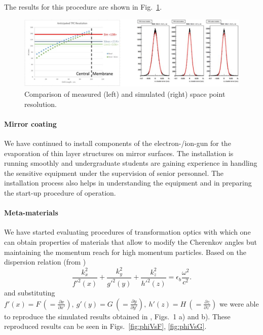 The results for this procedure are shown in Fig.~\ref{fig:TPCres}.
\begin{figure}
    \centering
    \includegraphics[width=\columnwidth]{SBU_plots/TPCresolution.jpg}
    \caption{\label{fig:TPCres}Comparison of measured (left) and simulated (right) space point resolution.}
\end{figure}

\paragraph{Mirror coating} We have continued to install components of the electron-/ion-gun for the evaporation of thin layer structures on mirror surfaces. The installation is running smoothly and undergraduate students are gaining experience in handling the sensitive equipment under the supervision of senior personnel. The installation process also helps in understanding the equipment and in preparing the start-up procedure of operation.

\paragraph{Meta-materials}
We have started evaluating procedures of transformation optics with which one can obtain properties of materials that allow to modify the Cherenkov angles but maintaining the momentum reach for high momentum particles. Based on the dispersion relation (from \cite{Vginis:2014})
\[\frac{k_x^2}{f'^2(x)}+\frac{k_y^2}{g'^2(y)}+\frac{k_z^2}{h'^2(z)}=\epsilon_b\frac{\omega^2}{c^2}.
\]
and substituting $f'(x)=F~(=\frac{\partial x}{\partial x'}),~g'(y)=G~(=\frac{\partial y}{\partial y'}),~h'(z)=H~(=\frac{\partial z}{\partial z'})$ we were able to reproduce the simulated results obtained in \cite{Vginis:2014}, Figs.~1 a) and b). These reproduced results can be seen in Figs.~\ref{fig:phiVsF}, \ref{fig:phiVsG}.

